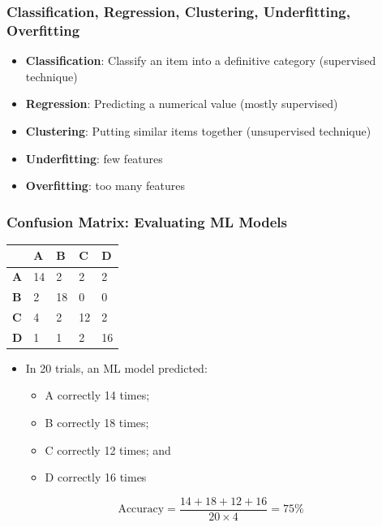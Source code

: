 \documentclass{article}
\begin{document}
\subsubsection*{Classification, Regression, Clustering, Underfitting, Overfitting}
\begin{itemize}
    \item \textbf{Classification}: Classify an item into a definitive category (supervised technique)
    \item \textbf{Regression}: Predicting a numerical value (mostly supervised)
    \item \textbf{Clustering}: Putting similar items together (unsupervised technique)
    \item \textbf{Underfitting}: few features
    \item \textbf{Overfitting}: too many features
\end{itemize}
\subsubsection*{Confusion Matrix: Evaluating ML Models}
\begin{center}
    \begin{tabular}{|l|l|l|l|l|}
        \hline
                    & \textbf{A} & \textbf{B} & \textbf{C} & \textbf{D} \\ \hline
        \textbf{A} & 14         & 2          & 2          & 2          \\ \hline
        \textbf{B} & 2          & 18         & 0          & 0          \\ \hline
        \textbf{C} & 4          & 2          & 12         & 2          \\ \hline
        \textbf{D} & 1          & 1          & 2          & 16         \\ \hline
    \end{tabular}
\end{center}
\begin{itemize}
    \item In 20 trials, an ML model predicted:
    \begin{itemize}
        \item A correctly 14 times;
        \item B correctly 18 times;
        \item C correctly 12 times; and
        \item D correctly 16 times
    \end{itemize}
\end{itemize}
\[\text{Accuracy} = \frac{14+18+12+16}{20 \times 4} = 75\%\]
\end{document}
